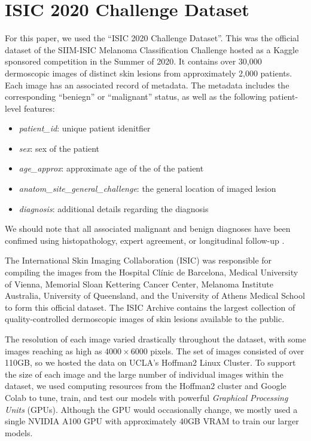 \documentclass [MAS] {uclathes}
\begin{document}
\section{ISIC 2020 Challenge Dataset}

For this paper, we used the ``ISIC 2020 Challenge Dataset''. This was the official dataset of the SIIM-ISIC Melanoma Classification Challenge hosted as a Kaggle sponsored competition in the Summer of 2020. It contains over 30,000 dermoscopic images of distinct skin lesions from approximately 2,000 patients. Each image has an associated record of metadata. The metadata includes the corresponding ``beniegn'' or ``malignant'' status, as well as the following patient-level features: 

\begin{itemize}
    \item \textit{patient\_id}: unique patient idenitfier
    \item \textit{sex}: sex of the patient 
    \item \textit{age\_approx}: approximate age of the of the patient
    \item \textit{anatom\_site\_general\_challenge}: the general location of imaged lesion
    \item \textit{diagnosis}: additional details regarding the diagnosis
\end{itemize}

We should note that all associated malignant and benign diagnoses have been confimed using histopathology, expert agreement, or longitudinal follow-up \cite{ISIC}.

The International Skin Imaging Collaboration (ISIC) was responsible for compiling the images from the Hospital Clínic de Barcelona, Medical University of Vienna, Memorial Sloan Kettering Cancer Center, Melanoma Institute Australia, University of Queensland, and the University of Athens Medical School to form this official dataset. The ISIC Archive contains the largest collection of quality-controlled dermoscopic images of skin lesions available to the public. 

The resolution of each image varied drastically throughout the dataset, with some images reaching as high as $4000 \times 6000$ pixels. The set of images consisted of over 110GB, so we hosted the data on UCLA's Hoffman2 Linux Cluster. To support the size of each image and the large number of individual images within the dataset, we used computing resources from the Hoffman2 cluster and Google Colab to tune, train, and test our models with powerful \textit{Graphical Processing Units} (GPUs). Although the GPU would occasionally change, we mostly used a single NVIDIA A100 GPU with approximately 40GB VRAM to train our larger models.
\end{document}
